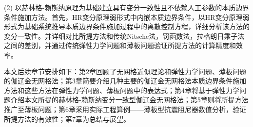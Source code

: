 (2) 以赫林格-赖斯纳原理为基础建立具有变分一致性且不依赖人工参数的本质边界条件施加方法。首先，HR变分原理弱形式中内嵌本质边界条件，以HR变分原理弱形式为基础系统推导本质边界条件施加过程中的离散控制方程，详细分析该方法的变分一致性。并详细对比所提方法和传统Nitsche法，罚函数法，拉格朗日乘子法之间的差别，并通过传统弹性力学问题和薄板问题验证所提方法的计算精度和效率。

本文后续章节安排如下：第2章回顾了无网格近似理论和弹性力学问题、薄板问题的伽辽金无网格法；第3章简要介绍几种主要的伽辽金无网格法本质边界条件施加方法和这些方法在弹性力学问题、薄板问题中的表达式；第4章将基于弹性力学问题介绍本文所提的赫林格-赖斯纳变分一致型伽辽金无网格法；第5章则将所提方法推广至薄板问题；第6章采用实际工程算例——薄板型抗震阻尼器数值分析，验证所提方法的有效性；第7章为总结与展望。


